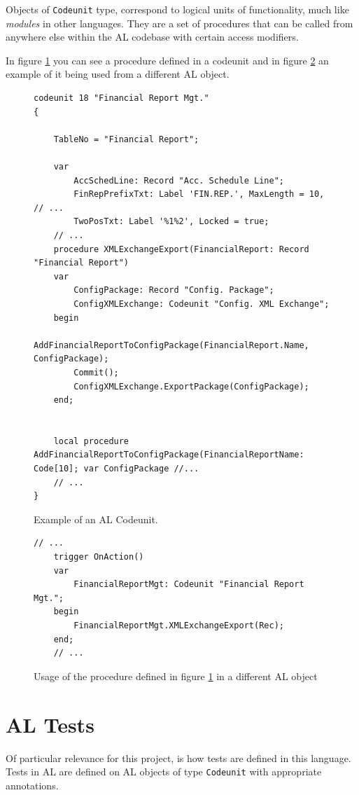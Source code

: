 Objects of \texttt{Codeunit} type, correspond to logical units of functionality, much like \emph{modules} in 
other languages. They are a set of procedures that can be called from anywhere else within the AL codebase
with certain access modifiers.

In figure \ref{f:app-al-codeunit} you can see a procedure defined in a codeunit and in figure \ref{f:app-al-codeunit-usage}
an example of it being used from a different AL object.

\begin{figure}
    \begin{Verbatim}[fontsize=\tiny]
codeunit 18 "Financial Report Mgt."
{

    TableNo = "Financial Report";

    var
        AccSchedLine: Record "Acc. Schedule Line";
        FinRepPrefixTxt: Label 'FIN.REP.', MaxLength = 10, // ...
        TwoPosTxt: Label '%1%2', Locked = true;
    // ...
    procedure XMLExchangeExport(FinancialReport: Record "Financial Report")
    var
        ConfigPackage: Record "Config. Package";
        ConfigXMLExchange: Codeunit "Config. XML Exchange";
    begin
        AddFinancialReportToConfigPackage(FinancialReport.Name, ConfigPackage);
        Commit();
        ConfigXMLExchange.ExportPackage(ConfigPackage);
    end;


    local procedure AddFinancialReportToConfigPackage(FinancialReportName: Code[10]; var ConfigPackage //...
    // ...
}
    \end{Verbatim}
    \caption{Example of an AL Codeunit.}
    \label{f:app-al-codeunit}
\end{figure}

\begin{figure}
    \begin{Verbatim}[fontsize=\tiny]
    // ...
    trigger OnAction()
    var
        FinancialReportMgt: Codeunit "Financial Report Mgt.";
    begin
        FinancialReportMgt.XMLExchangeExport(Rec);
    end;
    // ...
    \end{Verbatim}
    \caption{Usage of the procedure defined in figure \ref{f:app-al-codeunit} in a different AL object}
    \label{f:app-al-codeunit-usage}
\end{figure}

\section{AL Tests}

Of particular relevance for this project, is how tests are defined in this language. Tests in AL are defined
 on AL objects of type \texttt{Codeunit} with appropriate annotations.

